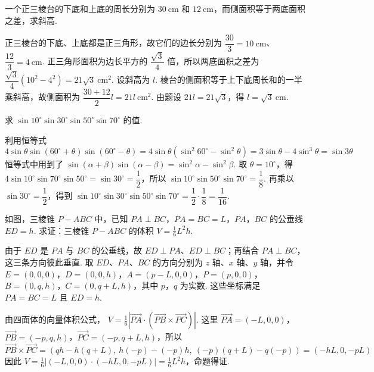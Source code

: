 \begin{problem}

一个正三棱台的下底和上底的周长分别为 \(30 \mathrm{~cm}\) 和 \(12 \mathrm{~cm}\)，而侧面积等于两底面积之差，求斜高.
\end{problem}

\begin{solution}
正三棱台的下底、上底都是正三角形，故它们的边长分别为
\(\dfrac{30}{3}=10\mathrm{~cm}\)、\(\dfrac{12}{3}=4\mathrm{~cm}\). 正三角形面积为边长平方的 \(\dfrac{\sqrt3}{4}\) 倍，所以两底面积之差为
\(\dfrac{\sqrt3}{4}\left(10^2-4^2\right)=21\sqrt3\mathrm{~cm}^2\).
设斜高为 \(l\). 棱台的侧面积等于上下底周长和的一半乘斜高，故侧面积为
\(\dfrac{30+12}{2}l=21l\mathrm{~cm}^2\). 由题设 \(21l=21\sqrt3\)，得 \(l=\sqrt3\mathrm{~cm}\).
\end{solution}

\begin{problem}

求 \(\sin 10^\circ \sin 30^\circ \sin 50^\circ \sin 70^\circ\) 的值.
\end{problem}

\begin{solution}
利用恒等式
\[
4\sin\theta\sin\left(60^\circ+\theta\right)\sin\left(60^\circ-\theta\right)
=4\sin\theta\left(\sin^2 60^\circ-\sin^2\theta\right)
=3\sin\theta-4\sin^3\theta
=\sin3\theta
\]
恒等式中用到了 \(\sin(\alpha+\beta)\sin(\alpha-\beta)=\sin^2\alpha-\sin^2\beta\). 取 \(\theta=10^\circ\)，得
\(4\sin10^\circ\sin70^\circ\sin50^\circ=\sin30^\circ=\dfrac12\)，所以
\(\sin10^\circ\sin50^\circ\sin70^\circ=\dfrac18\). 再乘以 \(\sin30^\circ=\dfrac12\)，得到
\(\sin10^\circ\sin30^\circ\sin50^\circ\sin70^\circ=\dfrac12\cdot\dfrac18=\dfrac1{16}\).
\end{solution}

\begin{problem}

如图，三棱锥 \(P-ABC\) 中，已知 \(PA \perp BC\)，\(PA = BC = L\)，\(PA\)，\(BC\) 的公垂线 \(ED = h\). 求证：三棱锥 \(P-ABC\) 的体积 \(V = \frac{1}{6}L^2h\).
\end{problem}

\begin{solution}
由于 \(ED\) 是 \(PA\) 与 \(BC\) 的公垂线，故 \(ED\perp PA\)、\(ED\perp BC\)；再结合 \(PA\perp BC\)，这三条方向彼此垂直. 取 \(ED\)、\(PA\)、\(BC\) 的方向分别为 \(z\) 轴、\(x\) 轴、\(y\) 轴，并令
\(E=(0,0,0)\)，\(D=(0,0,h)\)，\(A=(p-L,0,0)\)，\(P=(p,0,0)\)，\(B=(0,q,h)\)，\(C=(0,q+L,h)\)，其中 \(p\)，\(q\) 为实数. 这些坐标满足 \(PA=BC=L\) 且 \(ED=h\).

由四面体的向量体积公式，
\(V=\frac16\left|\overrightarrow{PA}\cdot\left(\overrightarrow{PB}\times\overrightarrow{PC}\right)\right|\). 这里 \(\overrightarrow{PA}=(-L,0,0)\)，\(\overrightarrow{PB}=(-p,q,h)\)，\(\overrightarrow{PC}=(-p,q+L,h)\)，所以
\[
\overrightarrow{PB}\times\overrightarrow{PC}
=\left(qh-h(q+L),\ h(-p)-(-p)h,\ (-p)(q+L)-q(-p)\right)
=(-hL,0,-pL)
\]
因此
\(V=\frac16\left|(-L,0,0)\cdot(-hL,0,-pL)\right|=\frac16L^2h\)，命题得证.
\end{solution}

